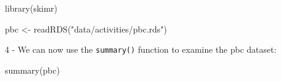 \documentclass[
]{memoir}
\newenvironment{Shaded}{\begin{snugshade}}{\end{snugshade}}
\newcommand{\FunctionTok}[1]{\textcolor[rgb]{0.00,0.00,0.00}{#1}}
\newcommand{\NormalTok}[1]{#1}
\newcommand{\OtherTok}[1]{\textcolor[rgb]{0.56,0.35,0.01}{#1}}
\newcommand{\StringTok}[1]{\textcolor[rgb]{0.31,0.60,0.02}{#1}}
\begin{document}
\begin{Shaded}
\begin{Highlighting}[]
\FunctionTok{library}\NormalTok{(skimr)}

\NormalTok{pbc }\OtherTok{\textless{}{-}} \FunctionTok{readRDS}\NormalTok{(}\StringTok{"data/activities/pbc.rds"}\NormalTok{)}
\end{Highlighting}
\end{Shaded}

4 - We can now use the \texttt{summary()} function to examine the pbc dataset:

\begin{Shaded}
\begin{Highlighting}[]
\FunctionTok{summary}\NormalTok{(pbc)}
\end{Highlighting}
\end{Shaded}
\end{document}
